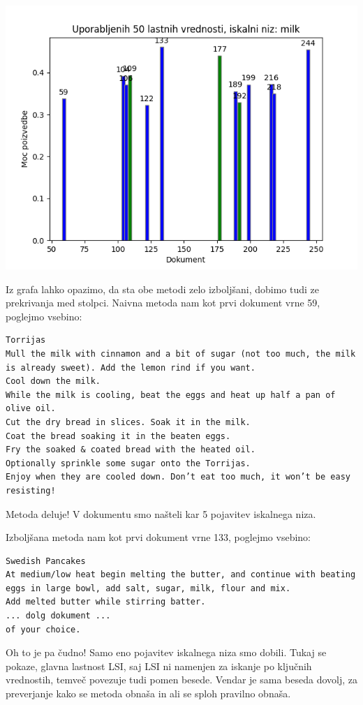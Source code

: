 \documentclass{article}
\begin{document}
\begin{center}
    \includegraphics[scale=0.65]{../graphs/generated_graphs/graph_50_singular_values_used.png}
\end{center}

Iz grafa lahko opazimo, da sta obe metodi zelo izboljšani, dobimo tudi ze prekrivanja med stolpci.
Naivna metoda nam kot prvi dokument vrne 59, poglejmo vsebino:
\begin{verbatim}
Torrijas
Mull the milk with cinnamon and a bit of sugar (not too much, the milk is already sweet). Add the lemon rind if you want.
Cool down the milk.
While the milk is cooling, beat the eggs and heat up half a pan of olive oil.
Cut the dry bread in slices. Soak it in the milk.
Coat the bread soaking it in the beaten eggs.
Fry the soaked & coated bread with the heated oil.
Optionally sprinkle some sugar onto the Torrijas.
Enjoy when they are cooled down. Don’t eat too much, it won’t be easy resisting!
\end{verbatim}
Metoda deluje! V dokumentu smo našteli kar 5 pojavitev iskalnega niza.

Izboljšana metoda nam kot prvi dokument vrne 133, poglejmo vsebino:
\begin{verbatim}
Swedish Pancakes
At medium/low heat begin melting the butter, and continue with beating eggs in large bowl, add salt, sugar, milk, flour and mix.
Add melted butter while stirring batter.
... dolg dokument ...
of your choice.
\end{verbatim}
Oh to je pa čudno! Samo eno pojavitev iskalnega niza smo dobili. Tukaj se pokaze, glavna lastnost LSI, saj LSI ni namenjen za iskanje po ključnih vrednostih, temveč povezuje tudi pomen besede. Vendar 
je sama beseda dovolj, za preverjanje kako se metoda obnaša in ali se sploh pravilno obnaša.
\end{document}
